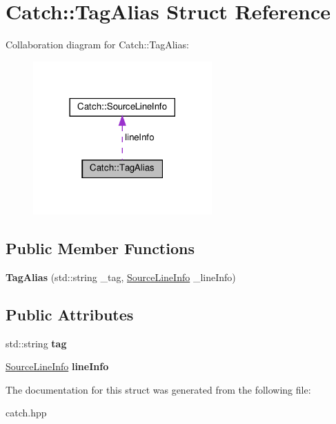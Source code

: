 \hypertarget{structCatch_1_1TagAlias}{}\section{Catch\+:\+:Tag\+Alias Struct Reference}
\label{structCatch_1_1TagAlias}


Collaboration diagram for Catch\+:\+:Tag\+Alias\+:\nopagebreak
\begin{figure}[H]
\begin{center}
\leavevmode
\includegraphics[width=194pt]{structCatch_1_1TagAlias__coll__graph}
\end{center}
\end{figure}
\subsection*{Public Member Functions}
\begin{DoxyCompactItemize}
\item 
\mbox{\label{structCatch_1_1TagAlias_ad9124d03bfb6f767f1c97572330b05bc}} 
{\bfseries Tag\+Alias} (std\+::string \+\_\+tag, \hyperlink{structCatch_1_1SourceLineInfo}{Source\+Line\+Info} \+\_\+line\+Info)
\end{DoxyCompactItemize}
\subsection*{Public Attributes}
\begin{DoxyCompactItemize}
\item 
\mbox{\label{structCatch_1_1TagAlias_a950183883ab17c90d0fab16b966b6e2d}} 
std\+::string {\bfseries tag}
\item 
\mbox{\label{structCatch_1_1TagAlias_a2f51fe0b3c052561275d26b6eb88f702}} 
\hyperlink{structCatch_1_1SourceLineInfo}{Source\+Line\+Info} {\bfseries line\+Info}
\end{DoxyCompactItemize}


The documentation for this struct was generated from the following file\+:\begin{DoxyCompactItemize}
\item 
catch.\+hpp\end{DoxyCompactItemize}

